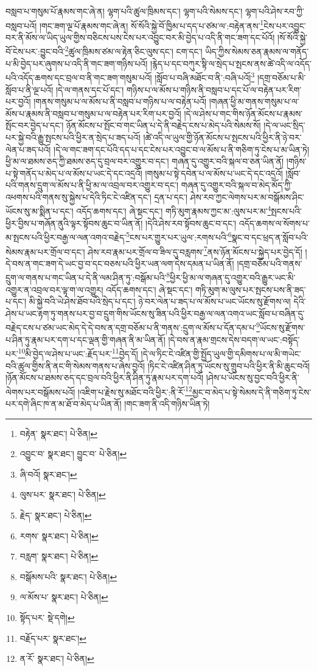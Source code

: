 བསླབ་པ་གསུམ་པོ་རྣམས་གང་ཞེ་ན། ལྷག་པའི་ཚུལ་ཁྲིམས་དང་། ལྷག་པའི་སེམས་དང་། ལྷག་པའི་ཤེས་རབ་ཀྱི་བསླབ་པའོ། །གང་ཟག་ལྔ་པོ་རྣམས་གང་ཞེ་ན། སོ་སོའི་སྐྱེ་བོ་ཁྱིམ་པ་དད་པ་ཙམ་ལ་:བརྟེན་ནས་\footnote{བརྟེན་  སྣར་ཐང་།  པེ་ཅིན། }ངེས་པར་འབྱུང་བར་ནི་མོས་ལ་ཡིད་ཡུལ་གྱིས་བཅིངས་པས་ངེས་པར་འབྱུང་བར་མི་བྱེད་པ་འདི་ནི་གང་ཟག་དང་པོའོ། །སོ་སོའི་སྐྱེ་བོ་ངེས་པར་:བྱུང་བའི་\footnote{འབྱུང་བ་  སྣར་ཐང་། བྱུང་བ་  པེ་ཅིན། }ཚུལ་ཁྲིམས་ཙམ་ལ་རྟེན་ཅིང་ལུས་དང་། ངག་དང་། ཡིད་ཀྱིས་སེམས་ཅན་རྣམས་ལ་གནོད་པ་མི་བྱེད་པར་ཞུགས་པ་འདི་ནི་གང་ཟག་གཉིས་པའོ། །རྙེད་པ་དང་བཀུར་སྟི་ལ་སྲེད་པ་སྤངས་ནས་ཚེ་འདི་ལ་འདོད་པའི་འདོད་ཆགས་དང་བྲལ་བ་ནི་གང་ཟག་གསུམ་པའོ། །སློབ་པ་བཞི་མཐོང་བ་ནི་:བཞི་པའོ།\footnote{ཞི་བའོ།  སྣར་ཐང་། } །དགྲ་བཅོམ་པ་མི་སློབ་པ་ནི་ལྔ་པའོ། །དེ་ལ་གནས་དང་པོ་དང་། གཉིས་པ་ལ་མོས་པ་གཉིས་ནི་བསླབ་པ་དང་པོ་ལ་བརྟེན་པར་རིག་པར་བྱའོ། །གནས་གསུམ་པ་ལ་མོས་པ་ནི་བསླབ་པ་གཉིས་པ་ལ་བརྟེན་པའོ། །གཞན་ཕྱི་མ་གནས་གསུམ་པ་ལ་མོས་པ་རྣམས་ནི་བསླབ་པ་གསུམ་པ་ལ་བརྟེན་པར་རིག་པར་བྱའོ། །དེ་ལ་ཤེས་པ་གང་གིས་ཉོན་མོངས་པ་རྣམས་སྤོང་བར་བྱེད་པ་དང་། ཉོན་མོངས་པ་སྤོང་བ་གང་ཡིན་པ་དེ་ནི་བརྗེད་ངས་པ་མེད་པའི་སེམས་སོ། །དེ་ལ་ཡང་སྲིད་པར་སྐྱེ་བའི་རྒྱུ་སྤངས་པའི་ཕྱིར་ན་སྲེད་པ་ཟད་པའོ། །ཚེ་འདི་ལ་ཡུལ་གྱི་ཉོན་མོངས་པ་སྤངས་པའི་ཕྱིར་ནི་ཉེ་བར་ལེན་པ་ཟད་པའོ། །དེ་ལ་གང་ཟག་དང་པོའི་དད་པ་དང་ངེས་པར་འབྱུང་བ་ལ་མོས་པ་ནི་གཅིག་ཏུ་ངེས་པ་མ་ཡིན་ཏེ། ཕྱི་མ་ལ་ཐམས་ཅད་ཀྱི་ཐམས་ཅད་དུ་བྲལ་བར་འགྱུར་བ་དང་། གཞན་དུ་འགྱུར་བའི་སྐལ་བ་ཅན་ཡིན་ནོ། །གཉིས་པ་སྟེ་གནོད་པ་མེད་པ་ལ་མོས་པ་ཡང་དེ་དང་འདྲའོ། །གསུམ་པ་སྟེ་དབེན་པ་ལ་མོས་པ་ཡང་དེ་དང་འདྲའོ། །སློབ་པའི་གནས་དྲུག་ལ་མོས་པ་ནི་ཕྱི་མ་ལ་འབྲལ་བར་འགྱུར་བ་དང་། གཞན་དུ་འགྱུར་བའི་སྐལ་བ་མེད་མོད་ཀྱི་འཕགས་པའི་གནས་སུ་སྐྱེས་པ་དེའི་ཏིང་ངེ་འཛིན་དང་། དྲན་པ་དང་། ཤེས་རབ་ཀྱང་ལེགས་པར་མ་བསྒོམས་ཤིང་ཡོངས་སུ་མ་སྨིན་པ་དང་། འདོད་ཆགས་དང་། ཞེ་སྡང་དང་། གཏི་མུག་རྣམས་ཀྱང་མ་:ལུས་པར་མ་\footnote{ལུས་པར་  སྣར་ཐང་།  པེ་ཅིན། }སྤངས་པའི་ཕྱིར་བྱིས་པ་གཞོན་ནུའི་ལྟར་སྟོབས་ཆུང་བ་ཡིན་ནོ། །དེའི་ཤེས་རབ་སྟོབས་ཆུང་བ་དང་། འདོད་ཆགས་ལ་སོགས་པ་མ་སྤངས་པའི་ཕྱིར་བརྒྱ་ལ་ལན་འགའ་བརྗེད་\footnote{རྗེད་  སྣར་ཐང་།  པེ་ཅིན། }ངས་པར་གྱུར་པར་ཡུལ་:རགས་པའི་\footnote{རགས་  སྣར་ཐང་།  པེ་ཅིན། }སྣང་བ་དང་ཕྲད་ན་སློབ་པའི་སེམས་རྣམ་པར་གྲོལ་བ་དང་། ཤེས་རབ་རྣམ་པར་གྲོལ་བ་ཟིལ་དུ་བརླགས་\footnote{བརླག་  སྣར་ཐང་།  པེ་ཅིན། }ནས་ཉོན་མོངས་པ་སྐྱེད་པར་བྱེད་དོ། །དེ་བས་ན་གང་ཟག་དེ་ཡང་བྱ་བ་དང་བཅས་པའི་ཕྱིར་ཡན་ལག་དེས་དམན་པ་ཡིན་ནོ། །དགྲ་བཅོམ་པའི་གནས་དྲུག་ལ་གནས་པ་གང་ཡིན་པ་དེ་ནི་ལམ་ཤིན་ཏུ་:བསྒོམ་པའི་\footnote{བསྒོམས་པའི་  སྣར་ཐང་།  པེ་ཅིན། }ཕྱིར་ཕྱི་མ་ལ་གཞན་དུ་འགྱུར་བའི་རྒྱུར་ཡང་མི་འགྱུར་ན་འབྲལ་བར་ལྟ་ག་ལ་འགྱུར། འདོད་ཆགས་དང་། ཞེ་སྡང་དང་། གཏི་མུག་མ་ལུས་པར་སྤངས་པས་ནི་ཟད་པ་དང་། མི་སྐྱེ་བའི་ཡེ་ཤེས་ཐོབ་པའི་སྲེད་པ་དང་། ཉེ་བར་ལེན་པ་ཟད་པ་ལ་མོས་པ་ཡང་ཡོངས་སུ་རྫོགས་ལ། དེའི་ཤེས་པ་ཡང་རྟག་ཏུ་གནས་པར་བྱ་བ་དྲུག་གིས་ཡོངས་སུ་ཟིན་པའི་ཕྱིར་བརྒྱ་ལ་ལན་འགའ་ཡང་སློབ་པ་བཞིན་དུ་བརྗེད་ངས་པ་ཙམ་ཡང་མེད་དེ་དེ་བས་ན་དགྲ་བཅོམ་པ་ནི་གནས་:དྲུག་ལ་མོས་པ་དོན་དམ་པ་\footnote{ལ་མོས་པ་  སྣར་ཐང་།  པེ་ཅིན། }ཡོངས་སུ་རྫོགས་པ་ཤིན་ཏུ་རྣམ་པར་དག་པ་དང་ལྡན་གྱི་གཞན་ནི་མ་ཡིན་ནོ། །དེ་བས་ན་རྣམ་གྲངས་དེས་བདག་ལ་ཡང་:བསྟོད་པར་\footnote{སྟོད་པར་  སྡེ་དགེ། }མི་བྱེད་ལ་ཤེས་པ་ཡང་:རྗོད་པར་\footnote{བརྗོད་པར་  སྣར་ཐང་། }བྱེད་དོ། །དེ་ལ་ཏིང་ངེ་འཛིན་གྱི་སྤྱོད་ཡུལ་གྱི་དམིགས་པ་ལ་མི་གཡེང་བའི་ཚུལ་གྱིས་ནི་ནང་གི་སེམས་གནས་པ་ཞེས་བྱའོ། །ཏིང་ངེ་འཛིན་ཤིན་ཏུ་ཡོངས་སུ་གྲུབ་པའི་ཕྱིར་ནི་མི་ཆུང་བའོ། །ཉོན་མོངས་པ་ཐམས་ཅད་དང་བྲལ་བའི་ཕྱིར་ནི་ཤིན་ཏུ་རྣམ་པར་དག་པའོ། །ཤེས་པ་ཡོངས་སུ་བྱང་བའི་ཕྱིར་ནི་ལེགས་པར་བསྒོམས་པའོ། །འཇིག་པ་རྗེས་སུ་མཐོང་བའི་ཕྱིར་:ནི་རོ་\footnote{ན་རོ་  སྣར་ཐང་།  པེ་ཅིན། }མྱང་བ་མེད་པ་སྟེ་སེམས་དེ་ནི་གཅིག་ཏུ་ངེས་པར་དགེ་ཞིང་ཁ་ན་མ་ཐོ་བ་མེད་པ་ཡིན་ནོ། །གང་ཟག་ནི་འདི་གཉིས་ཡིན་ཏེ། 